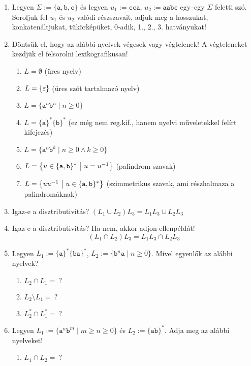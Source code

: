 \begin{enumerate}
	\item  Legyen $\Sigma := \{ \texttt{a},\texttt{b},\texttt{c} \}$ és legyen $u_1 := \texttt{cca}$, $u_2 := \texttt{aabc}$ egy–egy $\Sigma$ feletti szó. \\
	Soroljuk fel $u_1$ és $u_2$ valódi részszavait, adjuk meg a hosszukat, konkatenáltjukat, tükörképüket, 0-adik, 1., 2., 3. hatványukat!
	\item  Döntsük el, hogy az alábbi nyelvek végesek vagy végtelenek! A végteleneket kezdjük el felsorolni
	lexikografikusan!
	\begin{enumerate}
		\item $L = \emptyset$ (üres nyelv)
		\item $L=\{\varepsilon\}$ (üres szót tartalmazó nyelv)
		\item $L=\{\texttt{a}^n\texttt{b}^n \mid n \geq 0\}$
		\item $L=\{\texttt{a}\}^*\{\texttt{b}\}^*$ (ez még nem reg.kif., hanem nyelvi műveletekkel felírt kifejezés)
		\item $L=\{ \texttt{a}^n\texttt{b}^k \mid n \geq 0 \land k \geq 0\}$
		\item $L=\left\{ u \in \{\texttt{a},\texttt{b}\}^* ~ \middle\vert ~ u=u^{-1} \right\}$ (palindrom szavak)
		\item $L= \left\{ uu^{-1} ~ \middle\vert ~ u\in \{\texttt{a},\texttt{b}\}^* \right\}$ (szimmetrikus szavak, ami részhalmaza a palindromáknak)
	\end{enumerate}
	\item Igaz-e a disztributivitás? $(L_1 \cup L_2)L_3 = L_1L_3 \cup L_2L_3$
	\item Igaz-e a disztributivitás? Ha nem, akkor adjon ellenpéldát! \[ (L_1 \cap L_2)L_3 = L_1L_3 \cap L_2L_3 \]
	\item Legyen $L_1 := \{ \texttt{a} \}^*\{ \texttt{ba} \}^*$, $L_2 := \{ \texttt{b}^n\texttt{a} \mid n \geq 0 \}$. Mivel egyenlők az alábbi nyelvek?
	\begin{enumerate}
		\item $L_2 \cap L_1 = ~?$
		\item $L_2 \setminus L_1 = ~?$
		\item $L_2^* \cap L_1^* = ~?$
	\end{enumerate}
	\item Legyen $L_1 := \{ \texttt{a}^n\texttt{b}^m \mid m \geq n \geq 0 \}$ és $L_2 := \{ \texttt{ab} \}^*$. Adja meg az alábbi nyelveket!
	\begin{enumerate}
		\item $L_1 \cap L_2 = ~?$

\end{enumerate}
\end{enumerate}
